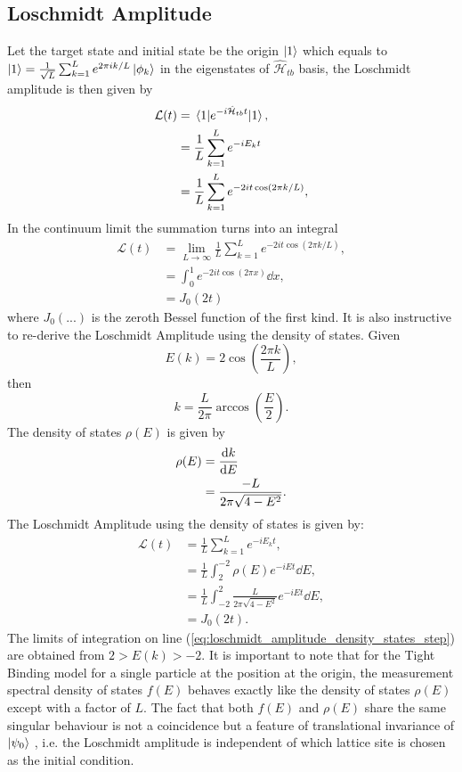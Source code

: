 \documentclass[12pt]{article}
\numberwithin{equation}{section}
\renewcommand{\H}{\mathcal{\hat{H}}}
\newcommand{\1}{\mathbb{1}}
\newcommand{\tb}{\H_{tb}}
\begin{document}
\subsection{Loschmidt Amplitude}
Let the target state and initial state be the origin $\ket{1}$ which equals to $\ket{1}=\frac{1}{\sqrt{L}}\sum_{k=1}^{L}e^{2\pi i k/L}\ket{\phi_k}$ in the eigenstates of $\tb$ basis, the Loschmidt amplitude is then given by 
\begin{align}
    \mathcal{L}(t)&=\expval{e^{-i \tb t}}{1},
    \\
    &=\frac{1}{L}\sum_{k=1}^Le^{-iE_kt}
    \\
    &=\frac{1}{L}\sum_{k=1}^{L}e^{-2it\cos(2\pi k/L)},
\end{align}
In the continuum limit the summation turns into an integral
\begin{align}
    \mathcal{L}(t)&=\lim_{L\to\infty}\frac{1}{L}\sum_{k=1}^{L}e^{-2it\cos(2\pi k/L)},
    \\
    &=\int_0^1 e^{-2it\cos(2\pi x)} \dd x,
    \\
    &=J_0(2t)
\end{align}
where $J_0(...)$ is the zeroth Bessel function of the first kind. It is also instructive to re-derive the Loschmidt Amplitude using the density of states.
Given 
\begin{equation}
    E(k)=2\cos \left(\frac{2\pi k}{ L}\right),
\end{equation}
then
\begin{equation}
    k=\frac{L}{2\pi}\arccos(\frac{E}{2}).
\end{equation}
The density of states $\rho(E)$ is given by
\begin{align}
    \rho(E)&=\dv{k}{E}
    \\
    &=\frac{-L}{2\pi \sqrt{4-E^2}}.
\end{align}
The Loschmidt Amplitude using the density of states is given by:
\begin{align}
    \mathcal{L}(t)&=\frac{1}{L}\sum_{k=1}^{L}e^{-iE_kt},
    \\
    &=\frac{1}{L}\int_{2}^{-2}\rho(E)e^{-iEt}\dd E, \label{eq:loschmidt_amplitude_density_states_step}
    \\
    &=\frac{1}{L}\int_{-2}^{2} \frac{L}{2\pi \sqrt{4-E^2}}e^{-iEt}\dd E,
    \\
    &=J_0(2t).
\end{align}
The limits of integration on line (\ref{eq:loschmidt_amplitude_density_states_step}) are obtained from $2>E(k)>-2$. It is important to note that for the Tight Binding model for a single particle at the position at the origin, the measurement spectral density of states $f(E)$ behaves exactly like the density of states $\rho(E)$ except with a factor of $L$. The fact that both $f(E)$ and $\rho(E)$ share the same singular behaviour is not a coincidence but a feature of translational invariance of $\ket{\psi_0}$ \cite{Thiel_2018}, i.e. the Loschmidt amplitude is independent of which lattice site is chosen as the initial condition.
\end{document}
